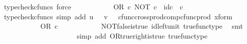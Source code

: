 \begin{isabellebody}
\ {\isacharparenleft}{\kern0pt}typecheck{\isacharunderscore}{\kern0pt}cfuncs{\isacharcomma}{\kern0pt}\ force{\isacharparenright}{\kern0pt}\isanewline
\ \ \ \ \ \ \isamarkupfalse%
\ \isamarkupfalse%
\ {\isachardoublequoteopen}{\isachardot}{\kern0pt}{\isachardot}{\kern0pt}{\isachardot}{\kern0pt}\ {\isacharequal}{\kern0pt}\ OR\ {\isasymcirc}\isactrlsub c\ {\isasymlangle}NOT\ {\isasymcirc}\isactrlsub c\ {\isasymf}{\isacharcomma}{\kern0pt}\ id\isactrlsub c\ {\isasymOmega}\ {\isasymcirc}\isactrlsub c\ {\isasymt}{\isasymrangle}{\isachardoublequoteclose}\isanewline
\ \ \ \ \ \ \ \ \isamarkupfalse%
\ {\isacharparenleft}{\kern0pt}typecheck{\isacharunderscore}{\kern0pt}cfuncs{\isacharcomma}{\kern0pt}\ simp\ add{\isacharcolon}{\kern0pt}\ {\isacartoucheopen}u\ {\isacharequal}{\kern0pt}\ {\isasymf}{\isacartoucheclose}\ {\isacartoucheopen}v\ {\isacharequal}{\kern0pt}\ {\isasymt}{\isacartoucheclose}\ cfunc{\isacharunderscore}{\kern0pt}cross{\isacharunderscore}{\kern0pt}prod{\isacharunderscore}{\kern0pt}comp{\isacharunderscore}{\kern0pt}cfunc{\isacharunderscore}{\kern0pt}prod\ x{\isacharunderscore}{\kern0pt}form{\isacharparenright}{\kern0pt}\isanewline
\ \ \ \ \ \ \isamarkupfalse%
\ \isamarkupfalse%
\ {\isachardoublequoteopen}{\isachardot}{\kern0pt}{\isachardot}{\kern0pt}{\isachardot}{\kern0pt}\ {\isacharequal}{\kern0pt}\ OR\ {\isasymcirc}\isactrlsub c\ {\isasymlangle}{\isasymt}{\isacharcomma}{\kern0pt}\ {\isasymt}{\isasymrangle}{\isachardoublequoteclose}\isanewline
\ \ \ \ \ \ \ \ \isamarkupfalse%
\ NOT{\isacharunderscore}{\kern0pt}false{\isacharunderscore}{\kern0pt}is{\isacharunderscore}{\kern0pt}true\ id{\isacharunderscore}{\kern0pt}left{\isacharunderscore}{\kern0pt}unit{}\ true{\isacharunderscore}{\kern0pt}func{\isacharunderscore}{\kern0pt}type\ \isamarkupfalse%
\ smt\isanewline
\ \ \ \ \ \ \isamarkupfalse%
\ \isamarkupfalse%
\ {\isachardoublequoteopen}{\isachardot}{\kern0pt}{\isachardot}{\kern0pt}{\isachardot}{\kern0pt}\ {\isacharequal}{\kern0pt}\ {\isasymt}{\isachardoublequoteclose}\isanewline
\ \ \ \ \ \ \ \ \isamarkupfalse%
\ {\isacharparenleft}{\kern0pt}simp\ add{\isacharcolon}{\kern0pt}\ OR{\isacharunderscore}{\kern0pt}true{\isacharunderscore}{\kern0pt}right{\isacharunderscore}{\kern0pt}is{\isacharunderscore}{\kern0pt}true\ true{\isacharunderscore}{\kern0pt}func{\isacharunderscore}{\kern0pt}type{\isacharparenright}{\kern0pt}\isanewline
\ \ \ \ \ \ \isamarkupfalse%
\ \isamarkupfalse%

\end{isabellebody}
